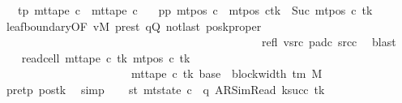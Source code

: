 \begin{isabellebody}
\ \ \ tp{}{\isacharcolon}{\kern0pt}\ {\isachardoublequoteopen}mt{\isacharunderscore}{\kern0pt}tape\ c{}\ {\isacharequal}{\kern0pt}\ mt{\isacharunderscore}{\kern0pt}tape\ c{}{\isachardoublequoteclose}\isanewline
\ \ \ pp{}{\isacharcolon}{\kern0pt}\ {\isachardoublequoteopen}mt{\isacharunderscore}{\kern0pt}pos\ c{}\ {\isacharequal}{\kern0pt}\ {\isacharparenleft}{\kern0pt}mt{\isacharunderscore}{\kern0pt}pos\ c{}{\isacharparenright}{\kern0pt}{\isacharparenleft}{\kern0pt}tk\ {\isacharcolon}{\kern0pt}{\isacharequal}{\kern0pt}\ Suc\ {\isacharparenleft}{\kern0pt}mt{\isacharunderscore}{\kern0pt}pos\ c{}\ tk{\isacharparenright}{\kern0pt}{\isacharparenright}{\kern0pt}{\isachardoublequoteclose}\isanewline
\ \ \ \ \isamarkupfalse%
\ leaf{\isacharunderscore}{\kern0pt}boundary{\isacharbrackleft}{\kern0pt}OF\ vM\ pre{\isacharunderscore}{\kern0pt}st\ qQ\ notlast\ posk{\isacharprime}{\kern0pt}{\isacharunderscore}{\kern0pt}proper\isanewline
\ \ \ \ \ \ \ \ \ \ \ \ \ \ \ \ \ \ \ \ \ \ \ \ \ \ \ \ \ \ \ \ \ \ \ \ \ \ \ \ \ \ \ \ \ \ refl\ vsrc{}\ pad{\isacharunderscore}{\kern0pt}c{}\ src{\isacharunderscore}{\kern0pt}c{}{\isacharbrackright}{\kern0pt}\ \isamarkupfalse%
\ blast\isanewline
\ \ \isamarkupfalse%
\ read{\isacharunderscore}{\kern0pt}cell{}{\isacharcolon}{\kern0pt}\ {\isachardoublequoteopen}mt{\isacharunderscore}{\kern0pt}tape\ c{}\ tk\ {\isacharparenleft}{\kern0pt}mt{\isacharunderscore}{\kern0pt}pos\ c{}\ tk{\isacharparenright}{\kern0pt}\isanewline
\ \ \ \ \ \ \ \ \ \ \ \ \ \ \ \ \ \ \ \ \ \ {\isacharequal}{\kern0pt}\ mt{\isacharunderscore}{\kern0pt}tape\ c{\isacharprime}{\kern0pt}\ tk\ {\isacharparenleft}{\kern0pt}base\ {\isacharplus}{\kern0pt}\ {\isacharparenleft}{\kern0pt}block{\isacharunderscore}{\kern0pt}width\ {\isacharparenleft}{\kern0pt}{\isasymGamma}{\isacharunderscore}{\kern0pt}tm\ M{\isacharparenright}{\kern0pt}\ {\isacharminus}{\kern0pt}\ {}{\isacharparenright}{\kern0pt}{\isacharparenright}{\kern0pt}{\isachardoublequoteclose}\isanewline
\ \ \ \ \isamarkupfalse%
\ pre{\isacharunderscore}{\kern0pt}tp\ pos{}{\isacharunderscore}{\kern0pt}tk\ \isamarkupfalse%
\ simp\isanewline
\ \ \isamarkupfalse%
\ st{}{\isacharprime}{\kern0pt}{\isacharcolon}{\kern0pt}\ {\isachardoublequoteopen}mt{\isacharunderscore}{\kern0pt}state\ c{}\ {\isacharequal}{\kern0pt}\ {\isacharparenleft}{\kern0pt}q{\isacharcomma}{\kern0pt}\ AR{\isacharunderscore}{\kern0pt}SimRead{\isacharcomma}{\kern0pt}\ k{\isacharunderscore}{\kern0pt}succ\ tk{\isacharcomma}{\kern0pt}\ {}{\isacharcomma}{\kern0pt}\isanewline

\end{isabellebody}
